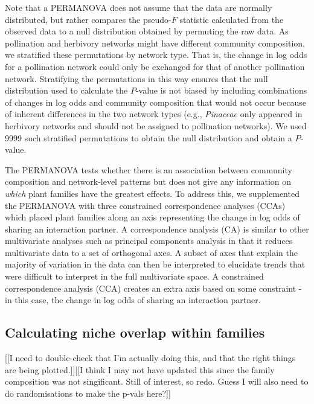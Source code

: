 \documentclass[12pt]{article}
\begin{document}
\begin{spacing}{1.5}
  Note that a PERMANOVA does not assume that the data are 
  normally distributed, but rather compares the pseudo-$F$ 
  statistic calculated from the observed data to a null 
  distribution obtained by permuting the raw data. As 
  pollination and herbivory networks might have different
  community composition, we stratified these permutations
  by network type. That is, the change in log odds for a pollination
  network could only be exchanged for that of another pollination
  network. Stratifying the permutations in this way ensures that 
  the null distribution used to calculate the $P$-value is not 
  biased by including combinations of changes in log odds and 
  community composition that would not occur because of inherent 
  differences in the two network types (e.g., \emph{Pinaceae} 
  only appeared in herbivory networks and should not be assigned 
  to pollination networks). We used 9999 such stratified permutations 
  to obtain the null distribution and obtain a $P$-value.


  The PERMANOVA tests whether there is an association between
  community composition and network-level patterns but does not
  give any information on \emph{which} plant families have the
  greatest effects. To address this, we supplemented the 
  PERMANOVA with three constrained correspondence analyses (CCAs)
  which placed plant families along an axis representing the
  change in log odds of sharing an interaction partner.
  A correspondence 
  analysis (CA) is similar to other multivariate
  analyses such as principal components analysis in that it
  reduces multivariate data to a set of orthogonal axes. A
  subset of axes that explain the majority of variation in 
  the data can then be interpreted to elucidate trends that
  were difficult to interpret in the full multivariate space.
  A constrained correspondence analysis (CCA) creates an extra
  axis based on some constraint - in this case, the change in
  log odds of sharing an interaction partner. 


\subsection*{Calculating niche overlap within families}

  [[I need to double-check that I'm actually doing this, and that the right things
  are being plotted.]][[I think I may not have updated this since the family composition 
  was not singificant. Still of interest, so redo. Guess I will also need to do randomisations
  to make the p-vals here?]]


\end{spacing}
\end{document}
